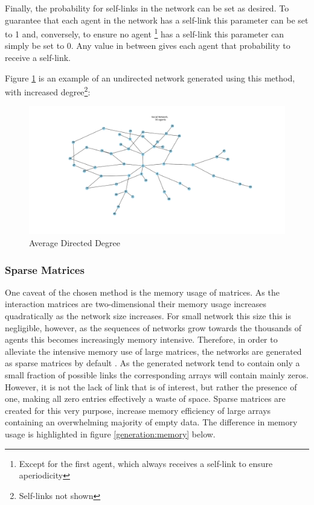\documentclass{article}
\begin{document}
Finally, the probability for self-links in the network can be set as desired. To guarantee that each agent in the network has a self-link this parameter can be set to 1 and, conversely, to ensure no agent \footnote{Except for the first agent, which always receives a self-link to ensure aperiodicity} has a self-link this parameter can simply be set to 0. Any value in between gives each agent that probability to receive a self-link.

Figure \ref{network:random} is an example of an undirected network generated using this method, with increased degree\footnote{Self-links not shown}:
\begin{center}
    \begin{figure}[!htbp]
        \centering
        \includegraphics[width=1.1\textwidth]{ThesisKI/Images/NoneGraphRandom.png}
        \caption{Average Directed Degree}
        \label{network:random}
    \end{figure}
\end{center}

\newpage

\subsubsection{Sparse Matrices}

One caveat of the chosen method is the memory usage of matrices. As the interaction matrices are two-dimensional their memory usage increases quadratically as the network size increases. For small network this size this is negligible, however, as the sequences of networks grow towards the thousands of agents this becomes increasingly memory intensive. Therefore, in order to alleviate the intensive memory use of large matrices, the networks are generated as sparse matrices by default \cite{2020SciPy-NMeth}. As the generated network tend to contain only a small fraction of possible links the corresponding arrays will contain mainly zeros. However, it is not the lack of link that is of interest, but rather the presence of one, making all zero entries effectively a waste of space. Sparse matrices are created for this very purpose, increase memory efficiency of large arrays containing an overwhelming majority of empty data. The difference in memory usage is highlighted in figure \ref{generation:memory} below.
\end{document}
